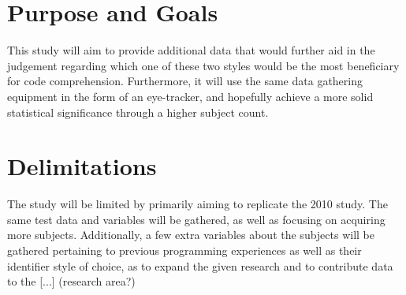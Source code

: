 \section{Purpose and Goals}
\iffalse
\begin{itemize}
	\item Write about the grand scheme of things
	\item Set the correct expectations
	\item What can I expect to learn if I keep on reading?
	\item What are the success criteria for this work?
	\item How will the work be evaluated?
\end{itemize}
\fi

This study will aim to provide additional data that would further aid in the judgement regarding which one of these two styles would be the most beneficiary for code comprehension. Furthermore, it will use the same data gathering equipment in the form of an eye-tracker, and hopefully achieve a more solid statistical significance through a higher subject count.

\section{Delimitations}
\iffalse
\begin{itemize}
	\item Scale down expectations and clarify
\end{itemize}
\fi

The study will be limited by primarily aiming to replicate the 2010 study. The same test data and variables will be gathered, as well as focusing on acquiring more subjects. Additionally, a few extra variables about the subjects will be gathered pertaining to previous programming experiences as well as their identifier style of choice, as to expand the given research and to contribute data to the [...] (research area?)